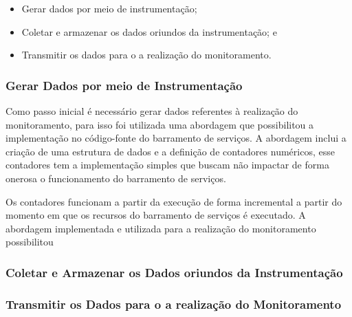 \begin{itemize}
    \item Gerar dados por meio de instrumentação;
    \item Coletar e armazenar os dados oriundos da instrumentação; e
    \item Transmitir os dados para o a realização do monitoramento. 
\end{itemize}

\subsubsection{Gerar Dados por meio de Instrumentação}
Como passo inicial é necessário gerar dados referentes à realização do monitoramento, para isso foi utilizada uma abordagem que possibilitou a implementação no código-fonte do barramento de serviços. A abordagem inclui a criação de uma estrutura de dados e a definição de contadores numéricos, esse contadores tem a implementação simples que buscam não impactar de forma onerosa o funcionamento do barramento de serviços.

Os contadores funcionam a partir da execução de forma incremental a partir do momento em que os recursos do barramento de serviços é executado. A abordagem implementada  e utilizada para a realização do monitoramento possibilitou 

\subsubsection{Coletar e Armazenar os Dados oriundos da Instrumentação}

\subsubsection{Transmitir os Dados para o a realização do Monitoramento}


